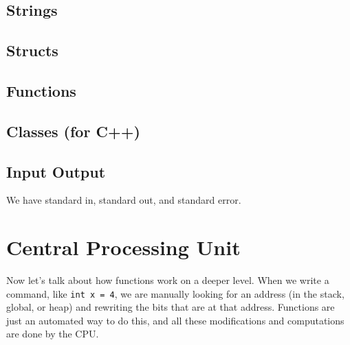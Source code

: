 \documentclass{article}
\begin{document}
  \subsection{Strings}

  \subsection{Structs}

  \subsection{Functions}

  \subsection{Classes (for C++)}

  \subsection{Input Output}
    
    We have standard in, standard out, and standard error. 

\section{Central Processing Unit} 

    Now let's talk about how functions work on a deeper level. When we write a command, like \texttt{int x = 4}, we are manually looking for an address (in the stack, global, or heap) and rewriting the bits that are at that address. Functions are just an automated way to do this, and all these modifications and computations are done by the CPU. 
\end{document}
